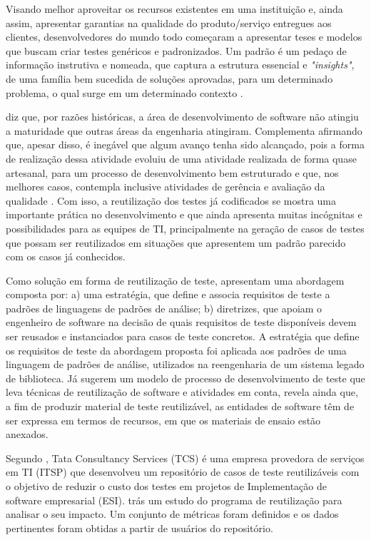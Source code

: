 \documentclass[tg]{mdtufsm}
\begin{document}
Visando melhor aproveitar os recursos existentes em uma instituição e, ainda assim, apresentar garantias na qualidade do produto/serviço entregues aos clientes, desenvolvedores do mundo todo começaram a apresentar
teses e modelos que buscam criar testes genéricos e padronizados. Um padrão é um pedaço de informação instrutiva e nomeada, que captura a estrutura essencial
e \emph{"insights"}, de uma família bem sucedida de soluções aprovadas, para um determinado problema, o qual surge em um determinado contexto \cite{cagnin2004reuso}.

\citeauthor{guizzardi2000desenvolvimento} diz que, por razões históricas, a área de desenvolvimento de software não atingiu a maturidade que outras áreas da engenharia atingiram. Complementa afirmando que, apesar disso, é inegável que algum avanço tenha sido alcançado, pois a forma de realização dessa atividade evoluiu de uma atividade realizada de forma quase artesanal, para um processo de
desenvolvimento bem estruturado e que, nos melhores casos, contempla inclusive atividades de gerência e avaliação da qualidade \cite{guizzardi2000desenvolvimento}.
Com isso, a reutilização dos testes já codificados se mostra uma importante prática no desenvolvimento e que ainda apresenta muitas incógnitas e possibilidades para as equipes de TI,
principalmente na geração de casos de testes que possam ser reutilizados em situações que apresentem um padrão parecido com os casos já conhecidos.

Como solução em forma de reutilização de teste, \cite{cagnin2004reuso} apresentam uma abordagem composta por: a) uma estratégia, que define e associa requisitos de teste a padrões de linguagens de padrões  de análise; b) diretrizes, que apoiam o engenheiro de software na decisão de quais requisitos de teste disponíveis devem ser reusados e instanciados para casos de teste concretos. A estratégia que define os requisitos de teste da abordagem proposta foi aplicada aos padrões de uma
linguagem de padrões de análise, utilizados na reengenharia de um sistema legado de biblioteca. Já \cite{karinsalo2004software} sugerem um modelo de processo de desenvolvimento de teste que leva técnicas de reutilização de software e atividades em conta, revela ainda que, a fim de produzir material de teste reutilizável, as entidades de software têm de ser expressa em termos de recursos, em que os materiais de ensaio estão anexados.

Segundo \cite{patel2014test}, Tata Consultancy Services (TCS)  é uma empresa provedora de serviços em TI (ITSP) que desenvolveu um repositório de casos de teste reutilizáveis com o objetivo de reduzir o custo dos testes em projetos de Implementação de software empresarial (ESI).\cite{patel2014test} trás um estudo do programa de reutilização para analisar o seu impacto. Um conjunto de métricas foram definidos e os dados pertinentes foram obtidas a partir de usuários do repositório.
\end{document}
